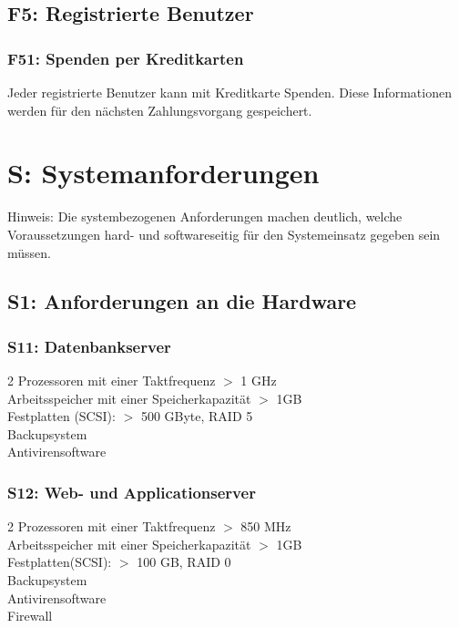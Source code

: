 \documentclass[10pt,a4paper]{scrartcl}
\begin{document}
\subsection{F5: Registrierte Benutzer}

\subsubsection*{F51: Spenden per Kreditkarten}
Jeder registrierte Benutzer kann mit Kreditkarte Spenden. Diese Informationen werden für den nächsten Zahlungsvorgang gespeichert.

\section{S: Systemanforderungen}
Hinweis: Die systembezogenen Anforderungen machen deutlich, welche Voraussetzungen hard- und softwareseitig für den Systemeinsatz gegeben sein müssen.

\subsection{S1: Anforderungen an die Hardware}
\subsubsection*{S11: Datenbankserver}

2 Prozessoren mit einer Taktfrequenz $>$ 1 GHz\\
Arbeitsspeicher mit einer Speicherkapazität $>$ 1GB\\
Festplatten (SCSI): $>$ 500 GByte, RAID 5\\
Backupsystem\\
Antivirensoftware

\subsubsection*{S12: Web- und Applicationserver}

2 Prozessoren mit einer Taktfrequenz $>$ 850 MHz\\
Arbeitsspeicher mit einer Speicherkapazität $>$ 1GB\\
Festplatten(SCSI): $>$ 100 GB, RAID 0\\
Backupsystem\\
Antivirensoftware\\
Firewall
\end{document}
